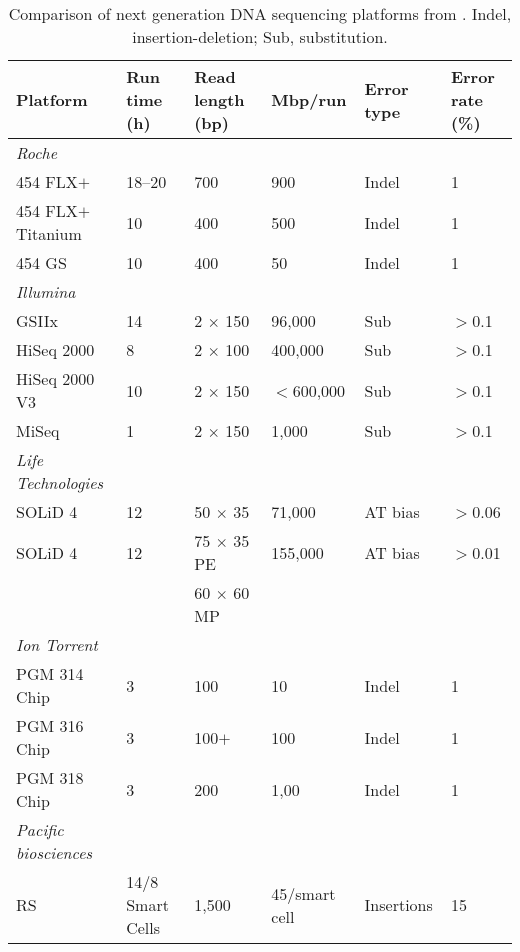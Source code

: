 \begin{table}
\footnotesize
\caption[Comparison of next generation \textsc{DNA} sequencing platforms]{Comparison of next generation \textsc{DNA} sequencing platforms from \citet{Scholz2012}. Indel, insertion-deletion; Sub, substitution.
}
\label{tab:seq_tech}
\smallskip
\begin{tabularx}{\textwidth}{p{3cm}p{2.5cm}XXp{1.5cm}p{1.2cm}}
\toprule
\textbf{Platform} & \textbf{Run time (h)} & \textbf{Read length (bp)} & \textbf{Mbp/run} & \textbf{Error type} & \textbf{Error rate (\%)} \\
\midrule
\emph{Roche}             &        &                   &            &              &   \\
454 FLX$+$               & 18--20 & 700               & 900        & Indel        & 1 \\
454 FLX$+$ Titanium      &  10    & 400               & 500        & Indel        & 1 \\
454 GS                   &  10    & 400               & 50         & Indel        & 1 \\
\emph{Illumina}          &        &                   &            &              &  \\
GSIIx                    & 14     & 2 $\times$ 150    & 96,000     & Sub          & $>$0.1 \\
HiSeq 2000               & 8      & 2 $\times$ 100    & 400,000    & Sub          & $>$0.1 \\
HiSeq 2000 V3            & 10     & 2 $\times$ 150    & $<$600,000 & Sub          & $>$0.1 \\
MiSeq                    & 1      & 2 $\times$ 150    & 1,000      & Sub          & $>$0.1 \\
\emph{Life Technologies} &  &  &  &  &  \\
SOLiD 4                  & 12     & 50 $\times$ 35    & 71,000     & AT bias     & $>$0.06 \\
SOLiD 4                  & 12     & 75 $\times$ 35 PE & 155,000    & AT bias     & $>$0.01 \\
                         &        & 60 $\times$ 60 MP &            &             &  \\
\emph{Ion Torrent}       &        &                   &            &             &  \\
PGM 314 Chip             & 3      & 100               & 10         &  Indel      & 1 \\
PGM 316 Chip             & 3      & 100$+$            & 100        &  Indel      & 1 \\
PGM 318 Chip             & 3      & 200               & 1,00       &  Indel      & 1 \\
\emph{Pacific biosciences} &  &  &  &  &  \\
RS                       & 14/8 Smart Cells & 1,500 & 45/smart cell &  Insertions & 15 \\
\bottomrule
\end{tabularx}
\end{table}
